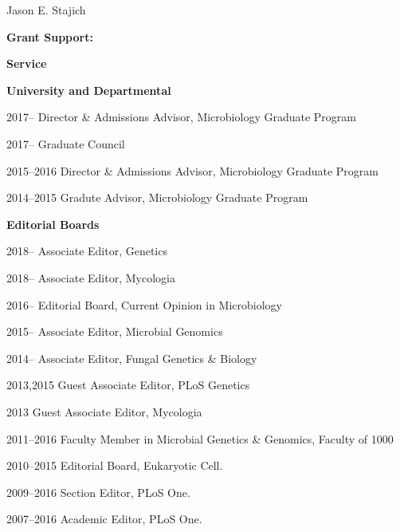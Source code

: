 \documentclass[10pt]{article}
\begin{document}
\begin{cv}{\centerline{Jason E. Stajich}}
\begin{cvlistcompact}{\bf Grant Support:}
\begin{cvlistcompact}{\bf Service}
\item[{\bf University and Departmental}]
\item [2017--] Director \& Admissions Advisor, Microbiology Graduate Program
\item [2017--] Graduate Council
\item [2015--2016] Director \& Admissions Advisor, Microbiology Graduate Program
\item [2014--2015] Gradute Advisor, Microbiology Graduate Program
  \\  
\item[{\bf Editorial Boards}]
\item [2018--] Associate Editor, Genetics
\item [2018--] Associate Editor, Mycologia
\item [2016--] Editorial Board, Current Opinion in Microbiology
\item [2015--] Associate Editor, Microbial Genomics
\item [2014--] Associate Editor, Fungal Genetics \& Biology
\item [2013,2015] Guest Associate Editor, PLoS Genetics
\item [2013] Guest Associate Editor, Mycologia
\item [2011--2016] Faculty Member in Microbial Genetics \& Genomics,
  Faculty of 1000
\item [2010--2015] Editorial Board, Eukaryotic Cell.
\item [2009--2016] Section Editor, PLoS One.
\item [2007--2016] Academic Editor, PLoS One.
\\
  

\end{cvlistcompact}
\end{cvlistcompact}
\end{cv}
\end{document}
